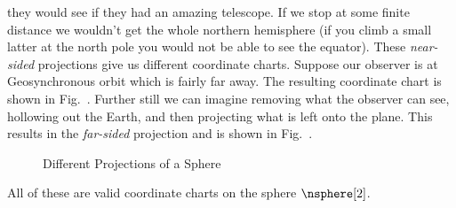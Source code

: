 \documentclass[oneside]{book}                                                  %
\begin{document}
                they would see if they had an amazing telescope. If we stop at
                some finite distance we wouldn't get the whole northern
                hemisphere (if you climb a small latter at the north pole you
                would not be able to see the equator). These
                \textit{near-sided} projections give us different coordinate
                charts. Suppose our observer is at Geosynchronous orbit which is
                fairly far away. The resulting coordinate chart is shown in
                Fig.~. Further still we can imagine
                removing what the observer can see, hollowing out the Earth, and
                then projecting what is left onto
                the plane. This results in the \textit{far-sided} projection
                and is shown in Fig.~.
                \begin{figure}[H]
                    \centering
                    \captionsetup{type=figure}
                    \begin{subfigure}[b]{0.49\textwidth}
                        \centering
                        \captionsetup{type=figure}
                        \label{fig:Near_Sided_Proj}
                    \end{subfigure}
                    \begin{subfigure}[b]{0.49\textwidth}
                        \centering
                        \captionsetup{type=figure}
                        \label{fig:Far_Sided_Proj}
                    \end{subfigure}
                    \caption{Different Projections of a Sphere}
                \end{figure}
                All of these are valid coordinate charts on the sphere
                $\nsphere[2]$.
\end{document}
